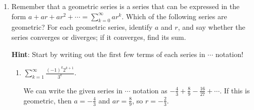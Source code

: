 \documentclass[main]{subfiles}
\begin{document}
\begin{enumerate}[resume]
\begin{enumerate}
    \begin{solution}
    By definition of convergence, we need to look at the limit of
    partial sums $\displaystyle \lim_{n \to \infty} s_n$.  If $r \neq
    1$, we have shown that this is equal to $\displaystyle \lim_{n \to
    \infty} \frac{a - ar^n}{1 - r} = \frac{a}{1-r}\cdot\lim_{n \to \infty} (1-r^n)$. (We can factor out $\frac{a}{1-r}$, since the limit only depends on $n$.)  When $|r| > 1$ or $r = -1$, this
    limit does not exist (if $|r| > 1$, then $r^n$ just grows bigger and
    bigger in magnitude; if $r = -1$, then $r^n$ just bounces between
    $1$ and $-1$ forever).  When $|r| < 1$, $r^n$ tends to 0, so
    $\displaystyle \lim_{n \to \infty} \frac{a - ar^n}{1 - r} =
    \frac{a}{1 - r}$.

    When $r = 1$, we have shown that $\displaystyle \lim_{n \to \infty}
    s_n = \lim_{n \to \infty} na$, which does not exist.

    So, to summarize,
   \[ a + ar + ar^2 + ar^3 + \cdots \left\{
    \begin{array}{l l}
    \textrm{converges to } \frac{a}{1 - r} & \textrm{ if } |r| < 1 \\
    \textrm{diverges} & \textrm{ if } |r| \geq 1
    \end{array} \right.\]
    \end{solution}
  \end{enumerate}
  \pspace{\newpage}
  \item 
  Remember that a geometric series is a series that can be expressed in the form $a + ar +
  ar^2 + \cdots = \displaystyle \sum_{k=0}^\infty ar^k$.  Which of the
  following series are geometric?  For each geometric series, identify $a$
  and $r$, and say whether the series converges or diverges; if it
  converges, find its sum. 
  
  \textbf{Hint}: Start by writing out the first few terms of each series in $\cdots$ notation!
  \begin{enumerate}
    \item
    \begin{problem}[\vfill]
    $\displaystyle \sum_{k=1}^\infty \frac{(-1)^k 2^{k+1}}{3^k}$.
    \end{problem}

    \begin{solution}
    We can write the given series in $\cdots$ notation as $- \frac{4}{3}
    + \frac{8}{9} - \frac{16}{27} + \cdots$.  If this is geometric, then
    $a = - \frac{4}{3}$ and $ar = \frac{8}{9}$, so $r = - \frac{2}{3}$.


\end{solution}
\end{enumerate}
\end{enumerate}
\end{document}
